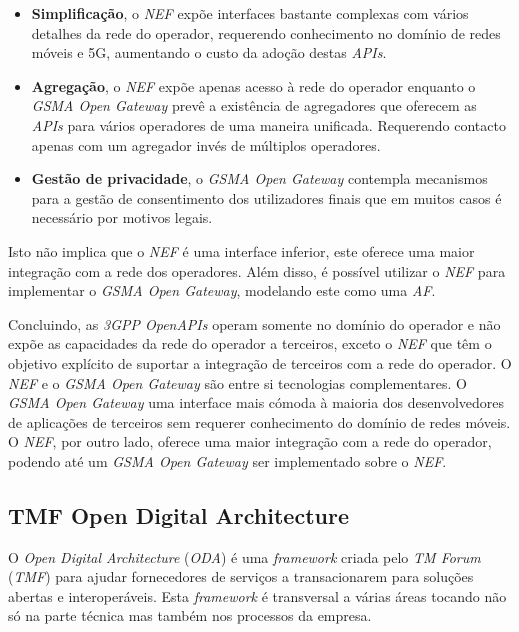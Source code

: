 \begin{itemize}
	\item \textbf{Simplificação}, o \emph{NEF} expõe interfaces bastante
	      complexas com vários detalhes da rede do operador, requerendo
	      conhecimento no domínio de redes móveis e 5G, aumentando o custo da
	      adoção destas \emph{APIs}.
	\item \textbf{Agregação}, o \emph{NEF} expõe apenas acesso à rede do
	      operador enquanto o \emph{GSMA Open Gateway} prevê a existência de
	      agregadores que oferecem as \emph{APIs} para vários operadores de uma
	      maneira unificada. Requerendo contacto apenas com um agregador invés de
	      múltiplos operadores.
	\item \textbf{Gestão de privacidade}, o \emph{GSMA Open Gateway}
	      contempla mecanismos para a gestão de consentimento dos utilizadores
	      finais que em muitos casos é necessário por motivos legais.
\end{itemize}

Isto não implica que o \emph{NEF} é uma interface inferior, este oferece uma
maior integração com a rede dos operadores. Além disso, é possível utilizar o
\emph{NEF} para implementar o \emph{GSMA Open Gateway}, modelando este como uma
\emph{AF}.

Concluindo, as \emph{3GPP OpenAPIs} operam somente no domínio do operador e não
expõe as capacidades da rede do operador a terceiros, exceto o \emph{NEF} que
têm o objetivo explícito de suportar a integração de terceiros com a rede do
operador. O \emph{NEF} e o \emph{GSMA Open Gateway} são entre si tecnologias
complementares. O \emph{GSMA Open Gateway} uma interface mais cómoda à maioria
dos desenvolvedores de aplicações de terceiros sem requerer conhecimento do
domínio de redes móveis. O \emph{NEF}, por outro lado, oferece uma maior
integração com a rede do operador, podendo até um \emph{GSMA Open Gateway} ser
implementado sobre o \emph{NEF}.

\subsection{TMF Open Digital Architecture}

O \emph{Open Digital Architecture} (\emph{ODA}) é uma \emph{framework} criada
pelo \emph{TM Forum} (\emph{TMF}) para ajudar fornecedores de serviços a
transacionarem para soluções abertas e interoperáveis. Esta \emph{framework} é
transversal a várias áreas tocando não só na parte técnica mas também nos
processos da empresa.


